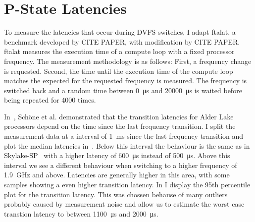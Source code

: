 

\section{P-State Latencies}
\label{sec:pstate_latencies}


To measure the latencies that occur during DVFS switches, I adapt ftalat, a benchmark developed by CITE PAPER, with modification by CITE PAPER.
ftalat measures the execution time of a compute loop with a fixed processor frequency.
The measurement methodology is as follows:
First, a frequency change is requested.
Second, the time until the execution time of the compute loop matches the expected for the requested frequency is measured.
The frequency is switched back and a random time between \SI{0}{\us} and \SI{20000}{\us} is waited before being repeated for \SI{4000}{} times.

In~\cite{Schoene_2024_Alder_Lake}, Schöne et al. demonstrated that the transition latencies for Alder Lake processors depend on the time since the last frequency transition.
I split the measurement data at a interval of \SI{1}{\ms} since the last frequency transition and plot the median latencies in~.
Below this interval the behaviour is the same as in Skylake-SP~\cite{Schoene_2019_SKL} with a higher latency of \SI{600}{\us} instead of \SI{500}{\us}.
Above this interval we see a different behaviour when switching to a higher frequency of \SI{1.9}{\GHz} and above.
Latencies are generally higher in this area, with some samples showing a even higher transition latency.
In  I display the 95th percentile plot for the transition latency.
This was chossen behause of many outliers probably caused by measurement noise and allow us to estimate the worst case transtion latency to between \SI{1100}{\us} and \SI{2000}{\us}.

